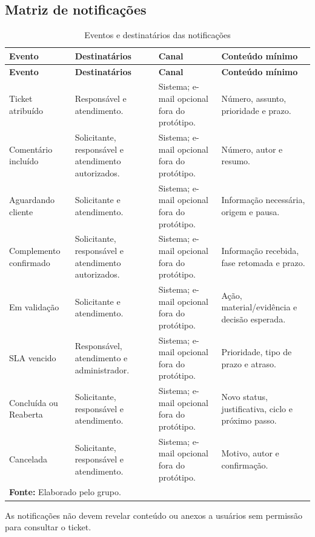 \normalsize

\subsection{Matriz de notificações}

\begin{longtable}{p{}p{}p{}p{}}
\caption{Eventos e destinatários das notificações}\label{tab:notificacoes}\\
\hline
\textbf{Evento} & \textbf{Destinatários} & \textbf{Canal} & \textbf{Conteúdo mínimo} \\
\hline
\endfirsthead
\hline
\textbf{Evento} & \textbf{Destinatários} & \textbf{Canal} & \textbf{Conteúdo mínimo} \\
\hline
\endhead
Ticket atribuído & Responsável e atendimento. & Sistema; e-mail opcional fora do protótipo. & Número, assunto, prioridade e prazo. \\
Comentário incluído & Solicitante, responsável e atendimento autorizados. & Sistema; e-mail opcional fora do protótipo. & Número, autor e resumo. \\
Aguardando cliente & Solicitante e atendimento. & Sistema; e-mail opcional fora do protótipo. & Informação necessária, origem e pausa. \\
Complemento confirmado & Solicitante, responsável e atendimento autorizados. & Sistema; e-mail opcional fora do protótipo. & Informação recebida, fase retomada e prazo. \\
Em validação & Solicitante e atendimento. & Sistema; e-mail opcional fora do protótipo. & Ação, material/evidência e decisão esperada. \\
SLA vencido & Responsável, atendimento e administrador. & Sistema; e-mail opcional fora do protótipo. & Prioridade, tipo de prazo e atraso. \\
Concluída ou Reaberta & Solicitante, responsável e atendimento. & Sistema; e-mail opcional fora do protótipo. & Novo status, justificativa, ciclo e próximo passo. \\
Cancelada & Solicitante, responsável e atendimento. & Sistema; e-mail opcional fora do protótipo. & Motivo, autor e confirmação. \\
\hline
\multicolumn{4}{l}{\footnotesize\textbf{Fonte:} Elaborado pelo grupo.}
\end{longtable}

As notificações não devem revelar conteúdo ou anexos a usuários sem permissão para consultar o ticket.
